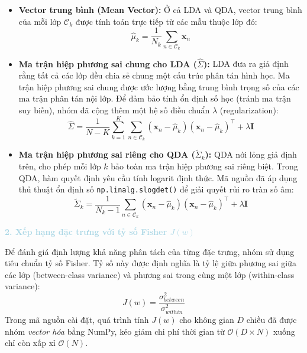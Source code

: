 \begin{itemize}
    \item \textbf{Vector trung bình (Mean Vector):} Ở cả LDA và QDA, vector trung bình của mỗi lớp $\mathcal{C}_k$ được tính toán trực tiếp từ các mẫu thuộc lớp đó:
    \begin{equation}
        \hat{\mu}_k = \frac{1}{N_k} \sum_{n \in \mathcal{C}_k} \mathbf{x}_n
    \end{equation}

    \item \textbf{Ma trận hiệp phương sai chung cho LDA ($\hat{\Sigma}$):} LDA đưa ra giả định rằng tất cả các lớp đều chia sẻ chung một cấu trúc phân tán hình học. Ma trận hiệp phương sai chung được ước lượng bằng trung bình trọng số của các ma trận phân tán nội lớp. Để đảm bảo tính ổn định số học (tránh ma trận suy biến), nhóm đã cộng thêm một hệ số điều chuẩn $\lambda$ (regularization):
    \begin{equation}
        \hat{\Sigma} = \frac{1}{N - K} \sum_{k=1}^K \sum_{n \in \mathcal{C}_k} (\mathbf{x}_n - \hat{\mu}_k)(\mathbf{x}_n - \hat{\mu}_k)^\top + \lambda \mathbf{I}
    \end{equation}

    \item \textbf{Ma trận hiệp phương sai riêng cho QDA ($\tilde{\Sigma}_k$):} QDA nới lỏng giả định trên, cho phép mỗi lớp $k$ bảo toàn ma trận hiệp phương sai riêng biệt. Trong QDA, hàm quyết định yêu cầu tính logarit định thức. Mã nguồn đã áp dụng thủ thuật ổn định số \texttt{np.linalg.slogdet()} để giải quyết rủi ro tràn số âm:
    \begin{equation}
        \tilde{\Sigma}_k = \frac{1}{N_k - 1} \sum_{n \in \mathcal{C}_k} (\mathbf{x}_n - \hat{\mu}_k)(\mathbf{x}_n - \hat{\mu}_k)^\top + \lambda \mathbf{I}
    \end{equation}
\end{itemize}

\vspace{0.5em}
\noindent\textcolor{lightblue}{\textbf{2. Xếp hạng đặc trưng với tỷ số Fisher $J(w)$}}
\vspace{0.5em}

Để đánh giá định lượng khả năng phân tách của từng đặc trưng, nhóm sử dụng tiêu chuẩn tỷ số Fisher. Tỷ số này được định nghĩa là tỷ lệ giữa phương sai giữa các lớp (between-class variance) và phương sai trong cùng một lớp (within-class variance):
\begin{equation}
    J(w) = \frac{\sigma_{between}^2}{\sigma_{within}^2}
\end{equation}
Trong mã nguồn cài đặt, quá trình tính $J(w)$ cho không gian $D$ chiều đã được nhóm \textit{vector hóa} bằng NumPy, kéo giảm chi phí thời gian từ $\mathcal{O}(D \times N)$ xuống chỉ còn xấp xỉ $\mathcal{O}(N)$.

